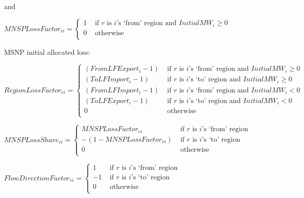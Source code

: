 \documentclass{article}
\begin{document}
and 

$MNSPLossFactor_{ri}=
\begin{cases}
1 &\textrm{ if $r$ is $i$'s `from' region and $InitialMW_{i} \geq 0$} \\
0 &\textrm{ otherwise} \\
\end{cases}$

MSNP initial allocated loss:







$RegionLossFactor_{ri} =
\begin{cases}
(FromLFExport_{i} - 1) & \textrm{ if $r$ is $i$'s `from' region and $InitialMW_{i} \geq 0$} \\
(ToLFImport_{i} - 1) &\textrm{ if $r$ is $i$'s `to' region and $InitialMW_{i} \geq 0$}\\
(FromLFImport_{i} - 1) &\textrm{ if $r$ is $i$'s `from' region and $InitialMW_{i} < 0$}\\
(ToLFExport_{i} - 1) &\textrm{ if $r$ is $i$'s `to' region and $InitialMW_{i} < 0$}\\
0 & \textrm{ otherwise}\\
\end{cases}$

$MNSPLossShare_{ri}=
\begin{cases}
MNSPLossFactor_{ri} & \textrm{ if $r$ is $i$'s `from' region} \\
- (1 - MNSPLossFactor_{ri}) &\textrm{ if $r$ is $i$'s `to' region}\\
0 & \textrm{ otherwise}\\
\end{cases}$

$FlowDirectionFactor_{ri}=
\begin{cases}
1 & \textrm{ if $r$ is $i$'s `from' region} \\
- 1 &\textrm{ if $r$ is $i$'s `to' region}\\
0 & \textrm{ otherwise}\\
\end{cases}$
\end{document}
